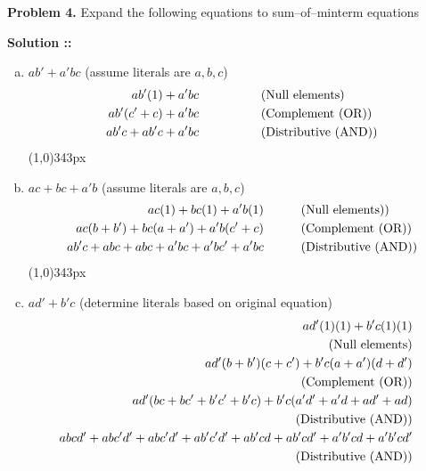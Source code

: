 \documentclass[11pt]{article}
\begin{document}

\textbf{Problem 4.} Expand the following equations to sum--of--minterm equations

\vspace{5px}\textbf{Solution ::}
\begin{enumerate}[a)]
    \item
    $ab' + a'bc$ \hspace{20pt}(assume literals are $a,b,c$)
    \begin{align*}
        ab'(1) + a'bc &\text{\hspace{50pt}(Null elements)} \\
        ab'(c'+c) + a'bc &\text{\hspace{50pt}(Complement (OR))} \\
        ab'c + ab'c + a'bc &\text{\hspace{50pt}(Distributive (AND))}
    \end{align*}
    \line(1,0){343px}

    \item
    $ac + bc + a'b$ \hspace{5pt}(assume literals are $a,b,c$)
    \begin{align*}
        ac(1) + bc(1) + a'b(1)&\text{\hspace{30pt}(Null elements))} \\
        ac(b+b') + bc(a+a')+a'b(c'+c)&\text{\hspace{30pt}(Complement (OR))} \\
        ab'c + abc + abc + a'bc + a'bc' + a'bc &\text{\hspace{30pt}(Distributive (AND))}
    \end{align*}
    \line(1,0){343px}

    \item
    $ad'+b'c$ \hspace{25pt}(determine literals based on original equation)
    \begin{align*}
        ad'(1)(1)+b'c(1)(1) \\
        \text{\hspace{15pt}(Null elements)}& \\
        ad'(b+b')(c+c')+b'c(a+a')(d+d') & \\
        \text{\hspace{15pt}(Complement (OR))}& \\
        ad'(bc+bc'+b'c'+b'c)+b'c(a'd'+a'd+ad'+ad) \\
        \text{\hspace{15pt}(Distributive (AND))}& \\
        abcd'+abc'd'+abc'd'+ab'c'd'+ab'cd+ab'cd'+a'b'cd+a'b'cd' \\
        \text{\hspace{15pt}(Distributive (AND))}
    \end{align*}
\end{enumerate}
\pagebreak
\end{document}

